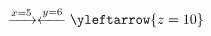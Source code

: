 \documentclass[preview]{standalone}
\begin{document}
\begin{align*}
\xrightarrow{x=5} \xleftarrow{y=6} \yleftarrow{z=10}
\end{align*}
\end{document}
